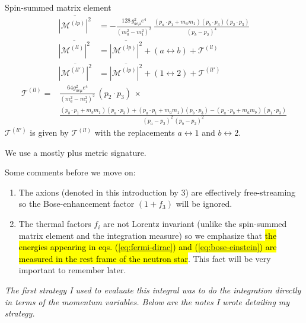 \begin{bluenv}{Spin-summed matrix element}
\vspace{-7px}
\begin{align}
    \label{eq:lp-matrix-element}
    \overline{| \mathcal{M}^{(lp)} |^2} 
    &= 
    - \frac{128 \, g^2_{ae\mu} e^4}{(m_a^2 - m_1^2)^2} \,
        \frac{
            (p_a \cdot p_1 + m_a m_1)
            (p_b \cdot p_3)
            (p_2 \cdot p_3)
        }
        {
            (p_b - p_2)^4
        } \\
    \label{eq:ll-matrix-element}
    \overline{| \mathcal{M}^{(ll)} |^2} 
        &= 
        \overline{| \mathcal{M}^{(lp)} |^2} 
        + (a \leftrightarrow b) 
        + \mathcal{T}^{(ll)} \\
    \label{eq:llp-matrix-element}
    \overline{| \mathcal{M}^{(ll')} |^2} 
        &= 
        \overline{| \mathcal{M}^{(lp)} |^2} 
        + (1 \leftrightarrow 2) 
        + \mathcal{T}^{(ll')} 
\end{align}
\begin{align*}
    \mathcal{T}^{(ll)} 
    = 
    &\frac{64 g_{ae\mu}^2 e^4}{(m_a^2 - m_1^2)^2} \, (p_2 \cdot p_3) \, \times\\
    &\frac{(p_b \cdot p_1 + m_b m_1)(p_a \cdot p_3) + (p_a \cdot p_1 + m_a m_1)(p_b \cdot p_3) - (p_a \cdot p_b + m_a m_b) (p_1 \cdot p_3) }{(p_a  - p_2)^2 \, (p_b - p_2)^2}
\end{align*}
$\mathcal{T}^{(ll')}$ is given by $\mathcal{T}^{(ll)}$ with the replacements
$a \leftrightarrow 1$ and $b \leftrightarrow 2$.

We use a mostly plus metric signature.
\end{bluenv}

Some comments before we move on:
\begin{enumerate}
    \item The axions (denoted in this introduction by $3$) are effectively free-streaming so the Bose-enhancement factor $(1 + f_3)$ will be ignored.
    \item The thermal factors $f_i$ are not Lorentz invariant (unlike the spin-summed matrix element and the integration measure) so we emphasize that \hl{the energies appearing in eqs. {(\ref{eq:fermi-dirac})} and  {(\ref{eq:bose-einstein})} are measured in the rest frame of the neutron star}. This fact will be very important to remember later.
\end{enumerate}

\emph{The first strategy I used to evaluate this integral was to do the integration directly in terms of the momentum variables. Below are the notes I wrote detailing my strategy.}

